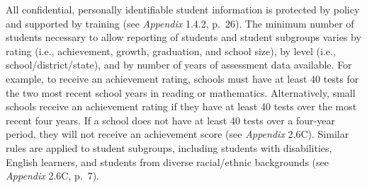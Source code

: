 \documentclass[]{article}
\begin{document}
All confidential, personally identifiable student information is
protected by policy and supported by training (see \emph{Appendix}
1.4.2, p.~26). The minimum number of students necessary to allow
reporting of students and student subgroups varies by rating (i.e.,
achievement, growth, graduation, and school size), by level (i.e.,
school/district/state), and by number of years of assessment data
available. For example, to receive an achievement rating, schools must
have at least 40 tests for the two most recent school years in reading
or mathematics. Alternatively, small schools receive an achievement
rating if they have at least 40 tests over the most recent four years.
If a school does not have at least 40 tests over a four-year period,
they will not receive an achievement score (see \emph{Appendix} 2.6C).
Similar rules are applied to student subgroups, including students with
disabilities, English learners, and students from diverse racial/ethnic
backgrounds (see \emph{Appendix} 2.6C, p.~7).
\end{document}
